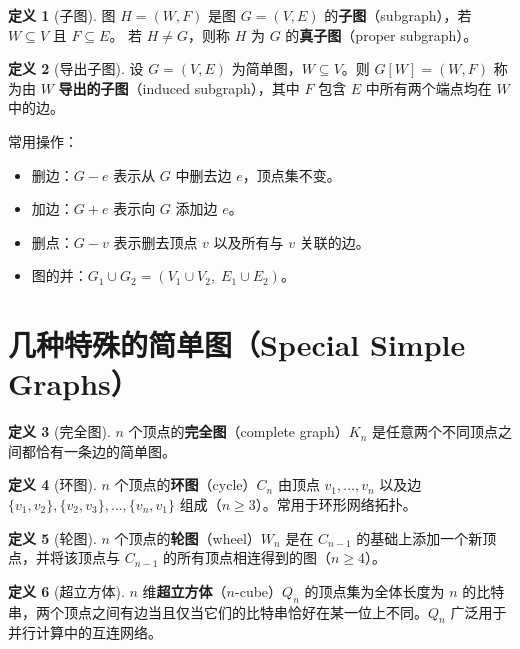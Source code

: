 \documentclass[UTF8,11pt,a4paper]{ctexbook}   %
\theoremstyle{definition}
\newtheorem{definition}{定义}[section]
\begin{document}
\begin{definition}[子图]
图 $H=(W,F)$ 是图 $G=(V,E)$ 的\textbf{子图}（subgraph），若 $W \subseteq V$ 且 $F \subseteq E$。
若 $H \neq G$，则称 $H$ 为 $G$ 的\textbf{真子图}（proper subgraph）。
\end{definition}

\begin{definition}[导出子图]
设 $G=(V,E)$ 为简单图，$W \subseteq V$。则 $G[W] = (W, F)$ 称为由 $W$ \textbf{导出的子图}（induced subgraph），其中 $F$ 包含 $E$ 中所有两个端点均在 $W$ 中的边。
\end{definition}

常用操作：
\begin{itemize}
    \item 删边：$G-e$ 表示从 $G$ 中删去边 $e$，顶点集不变。
    \item 加边：$G+e$ 表示向 $G$ 添加边 $e$。
    \item 删点：$G-v$ 表示删去顶点 $v$ 以及所有与 $v$ 关联的边。
    \item 图的并：$G_1 \cup G_2 = (V_1 \cup V_2,\; E_1 \cup E_2)$。
\end{itemize}

\section{几种特殊的简单图（Special Simple Graphs）}

\begin{definition}[完全图]
$n$ 个顶点的\textbf{完全图}（complete graph）$K_n$ 是任意两个不同顶点之间都恰有一条边的简单图。
\end{definition}

\begin{definition}[环图]
$n$ 个顶点的\textbf{环图}（cycle）$C_n$ 由顶点 $v_1,\dots,v_n$ 以及边 $\{v_1,v_2\},\{v_2,v_3\},\dots,\{v_n,v_1\}$ 组成（$n \geq 3$）。常用于环形网络拓扑。
\end{definition}

\begin{definition}[轮图]
$n$ 个顶点的\textbf{轮图}（wheel）$W_n$ 是在 $C_{n-1}$ 的基础上添加一个新顶点，并将该顶点与 $C_{n-1}$ 的所有顶点相连得到的图（$n \geq 4$）。
\end{definition}

\begin{definition}[超立方体]
$n$ 维\textbf{超立方体}（$n$-cube）$Q_n$ 的顶点集为全体长度为 $n$ 的比特串，两个顶点之间有边当且仅当它们的比特串恰好在某一位上不同。$Q_n$ 广泛用于并行计算中的互连网络。
\end{definition}
\end{document}
